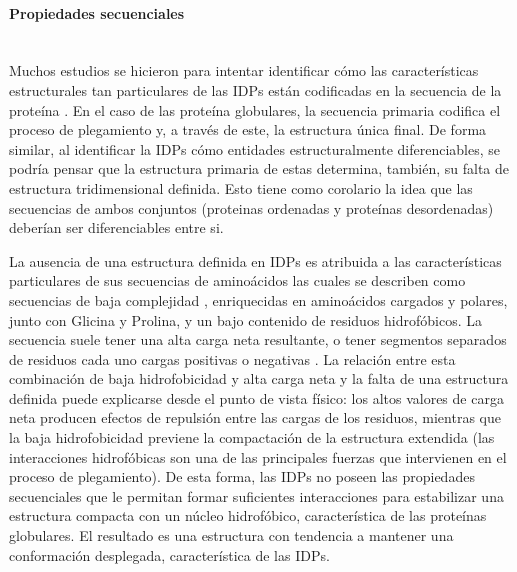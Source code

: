 \paragraph{Propiedades secuenciales} \hspace{0pt} \\
\indent Muchos estudios se hicieron para intentar identificar cómo las características estructurales tan particulares de las IDPs están codificadas en la secuencia de la proteína \cite{uversky2000natively}.
En el caso de las proteína globulares, la secuencia primaria codifica el proceso de plegamiento y, a través de este, la estructura única final. 
De forma similar, al identificar la IDPs cómo entidades estructuralmente diferenciables, se podría pensar que la estructura primaria de estas determina, también, su falta de estructura tridimensional definida.
Esto tiene como corolario la idea que las secuencias de ambos conjuntos (proteinas ordenadas y proteínas desordenadas) deberían ser diferenciables entre si.

La ausencia de una estructura definida en IDPs es atribuida a las características particulares de sus secuencias de aminoácidos las cuales se describen como secuencias de baja complejidad \cite{weathers2004reduced}, enriquecidas en aminoácidos 
cargados y polares, junto con Glicina y Prolina, y un bajo contenido de residuos hidrofóbicos. 
La secuencia suele tener una alta carga neta resultante, o tener segmentos separados de residuos cada uno cargas positivas o negativas \cite{mao2010net}.
La relación entre esta combinación de baja hidrofobicidad y alta carga neta y la falta de una estructura definida puede explicarse desde el punto de vista físico:
los altos valores de carga neta producen efectos de repulsión entre las cargas de los residuos, mientras que la baja hidrofobicidad previene la compactación de la estructura extendida 
(las interacciones hidrofóbicas son una de las principales fuerzas que intervienen en el proceso de plegamiento).
De esta forma, las IDPs no poseen las propiedades secuenciales que le permitan formar suficientes interacciones para estabilizar una estructura compacta con un núcleo hidrofóbico, característica de las proteínas globulares.
El resultado es una estructura con tendencia a mantener una conformación desplegada, característica de las IDPs.

